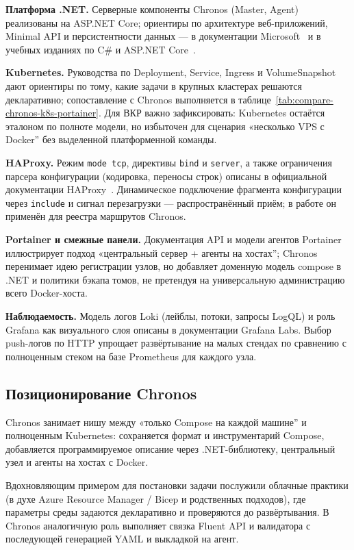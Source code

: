\textbf{Платформа .NET.} Серверные компоненты Chronos (Master, Agent) реализованы на ASP.NET Core; ориентиры по архитектуре веб-приложений, Minimal API и персистентности данных --- в документации Microsoft~\cite{dotnet_docs,aspnetcore_docs,aspnetcore_minimal_apis,ef_core_docs} и в учебных изданиях по C\# и ASP.NET Core~\cite{griffiths2021csharp,freeman2023proaspnet,smith2022modern_web}.

\textbf{Kubernetes.} Руководства по Deployment, Service, Ingress и VolumeSnapshot~\cite{burns2018kubernetes} дают ориентиры по тому, какие задачи в крупных кластерах решаются декларативно; сопоставление с Chronos выполняется в таблице~\ref{tab:compare-chronos-k8s-portainer}. Для ВКР важно зафиксировать: Kubernetes остаётся эталоном по полноте модели, но избыточен для сценария «несколько VPS с Docker'' без выделенной платформенной команды.

\textbf{HAProxy.} Режим \texttt{mode tcp}, директивы \texttt{bind} и \texttt{server}, а также ограничения парсера конфигурации (кодировка, переносы строк) описаны в официальной документации HAProxy~\cite{haproxy_docs}. Динамическое подключение фрагмента конфигурации через \texttt{include} и сигнал перезагрузки --- распространённый приём; в работе он применён для реестра маршрутов Chronos.

\textbf{Portainer и смежные панели.} Документация API и модели агентов Portainer иллюстрирует подход «центральный сервер + агенты на хостах''; Chronos перенимает идею регистрации узлов, но добавляет доменную модель compose в .NET и политики бэкапа томов, не претендуя на универсальную администрацию всего Docker-хоста.

\textbf{Наблюдаемость.} Модель логов Loki (лейблы, потоки, запросы LogQL) и роль Grafana как визуального слоя описаны в документации Grafana Labs. Выбор push-логов по HTTP упрощает развёртывание на малых стендах по сравнению с полноценным стеком на базе Prometheus для каждого узла.

\subsection{Позиционирование Chronos}

Chronos занимает нишу между «только Compose на каждой машине'' и полноценным Kubernetes: сохраняется формат и инструментарий Compose, добавляется программируемое описание через .NET-библиотеку, центральный узел и агенты на хостах с Docker.

Вдохновляющим примером для постановки задачи послужили облачные практики (в духе Azure Resource Manager / Bicep и родственных подходов), где параметры среды задаются декларативно и проверяются до развёртывания. В Chronos аналогичную роль выполняет связка Fluent API и валидатора с последующей генерацией YAML и выкладкой на агент.

